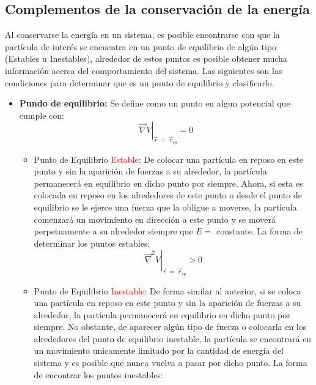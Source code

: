 \documentclass[/home/hernan/Documentos/Apuntes_mecanica_teorica/main.tex]{subfiles}
\begin{document}
	\newpage
	\subsection{Complementos de la conservación de la energía}

	\begin{definition}
		
		Al conservarse la energía en un sistema, es posible encontrarse con que la partícula de interés se encuentra en un punto de equilibrio de algún tipo (Estables u Inestables), alrededor de estos puntos es posible obtener mucha información acerca del comportamiento del sistema. Las siguientes son las condiciones para determinar que es un punto de equilibrio y clasificarlo.

		\begin{itemize}
			\item \textbf{Pundo de equilibrio: } Se define como un punto en algun potencial que cumple con: \\ 
				\begin{equation}
				\left .  \vec{\nabla }V \right|_{\vec{r} \: = \: \vec{r}_{eq}} = 0
				\end{equation}
			\begin{itemize}
				\item Punto de Equilibrio \textcolor{red}{Estable}: De colocar una partícula en reposo en este punto y sin la aparición de fuerzas a su alrededor, la partícula permanecerá en equilibrio en dicho punto por siempre. Ahora, si esta es colocada en reposo en los alrededores de este punto o desde el punto de equilibrio se le ejerce una fuerza que la obligue a moverse, la partícula comenzará un movimiento en dirección a este punto y se moverá perpetuamente a su alrededor siempre que $E =$ constante. La forma de determinar los puntos estables: \\ 
				\begin{equation}
					\left .  \vec{\nabla }^{2}V \right|_{\vec{r} \: = \: \vec{r}_{eq}} > 0
					\label{eq: puntoestable}
				\end{equation}
				\item Punto de Equilibrio \textcolor{red}{Inestable}: De forma similar al anterior, si se coloca una partícula en reposo en este punto y sin la aparición de fuerzas a su alrededor, la partícula permanecerá en equilibrio en dicho punto por siempre. No obstante, de aparecer algún tipo de fuerza o colocarla en los alrededores del punto de equilibrio inestable, la partícula se encontrará en un movimiento unicamente limitado por la cantidad de energía del sistema y es posible que nunca vuelva a pasar por dicho punto. La forma de encontrar los puntos inestables: \\  

\end{itemize}
\end{itemize}
\end{definition}
\end{document}
